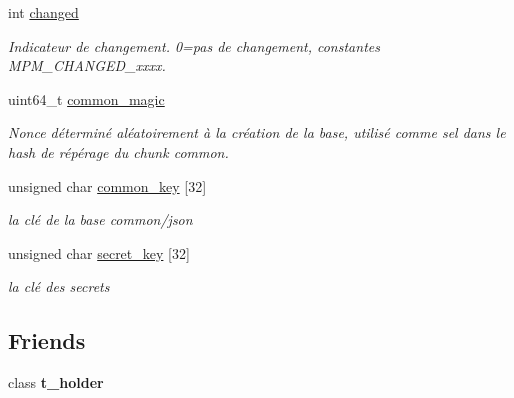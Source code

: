 \begin{DoxyCompactItemize}
\mbox{\label{classt__database_a318e6c89c1e88af8a82a087ae95977f7}} 
int \hyperlink{classt__database_a318e6c89c1e88af8a82a087ae95977f7}{changed}
\begin{DoxyCompactList}\small\item\em Indicateur de changement. 0=pas de changement, constantes M\+P\+M\+\_\+\+C\+H\+A\+N\+G\+E\+D\+\_\+xxxx. \end{DoxyCompactList}\item 
\mbox{\label{classt__database_a1b22543ada8b48317b9ee258bf87f96a}} 
uint64\+\_\+t \hyperlink{classt__database_a1b22543ada8b48317b9ee258bf87f96a}{common\+\_\+magic}
\begin{DoxyCompactList}\small\item\em Nonce déterminé aléatoirement à la création de la base, utilisé comme sel dans le hash de répérage du chunk common. \end{DoxyCompactList}\item 
\mbox{\label{classt__database_a9ab265cde6dbb0aada16432fb1362f47}} 
unsigned char \hyperlink{classt__database_a9ab265cde6dbb0aada16432fb1362f47}{common\+\_\+key} \mbox{[}32\mbox{]}
\begin{DoxyCompactList}\small\item\em la clé de la base common/json \end{DoxyCompactList}\item 
\mbox{\label{classt__database_a9ee0af0b17e7fe6f74e71278b09fc0cb}} 
unsigned char \hyperlink{classt__database_a9ee0af0b17e7fe6f74e71278b09fc0cb}{secret\+\_\+key} \mbox{[}32\mbox{]}
\begin{DoxyCompactList}\small\item\em la clé des secrets \end{DoxyCompactList}\end{DoxyCompactItemize}
\subsection*{Friends}
\begin{DoxyCompactItemize}
\item 
\mbox{\label{classt__database_ab4dd51667b2dc415a2cdd7ba225a4055}} 
class {\bfseries t\+\_\+holder}
\end{DoxyCompactItemize}


